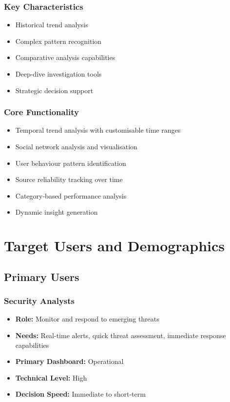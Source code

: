 \documentclass[11pt,a4paper]{article}
\begin{document}
\subsubsection{Key Characteristics}
\begin{itemize}
    \item Historical trend analysis
    \item Complex pattern recognition
    \item Comparative analysis capabilities
    \item Deep-dive investigation tools
    \item Strategic decision support
\end{itemize}

\subsubsection{Core Functionality}
\begin{itemize}
    \item Temporal trend analysis with customisable time ranges
    \item Social network analysis and visualisation
    \item User behaviour pattern identification
    \item Source reliability tracking over time
    \item Category-based performance analysis
    \item Dynamic insight generation
\end{itemize}

\section{Target Users and Demographics}

\subsection{Primary Users}

\subsubsection{Security Analysts}
\begin{itemize}
    \item \textbf{Role:} Monitor and respond to emerging threats
    \item \textbf{Needs:} Real-time alerts, quick threat assessment, immediate response capabilities
    \item \textbf{Primary Dashboard:} Operational
    \item \textbf{Technical Level:} High
    \item \textbf{Decision Speed:} Immediate to short-term
\end{itemize}
\end{document}
